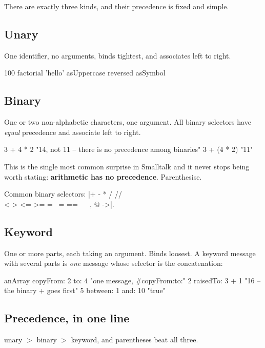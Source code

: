 There are exactly three kinds, and their precedence is fixed and simple.

\subsection{Unary}

One identifier, no arguments, binds tightest, and associates left to right.

\begin{st}
100 factorial
'hello' asUppercase reversed asSymbol
\end{st}

\subsection{Binary}

One or two non-alphabetic characters, one argument. All binary selectors have
\emph{equal} precedence and associate left to right.

\begin{st}
3 + 4 * 2           "14, not 11 -- there is no precedence among binaries"
3 + (4 * 2)         "11"
\end{st}

This is the single most common surprise in Smalltalk and it never stops being
worth stating: \textbf{arithmetic has no precedence}. Parenthesise.

Common binary selectors: \ct|+ - * / // \\ < > <= >= = ~= == ~~ , @ ->|.

\subsection{Keyword}

One or more  parts, each taking an argument. Binds loosest. A
keyword message with several parts is \emph{one} message whose selector is the
concatenation:

\begin{st}
anArray copyFrom: 2 to: 4         "one message, #copyFrom:to:"
2 raisedTo: 3 + 1                 "16 -- the binary + goes first"
5 between: 1 and: 10              "true"
\end{st}

\subsection{Precedence, in one line}

\begin{center}
unary $>$ binary $>$ keyword, and parentheses beat all three.
\end{center}

